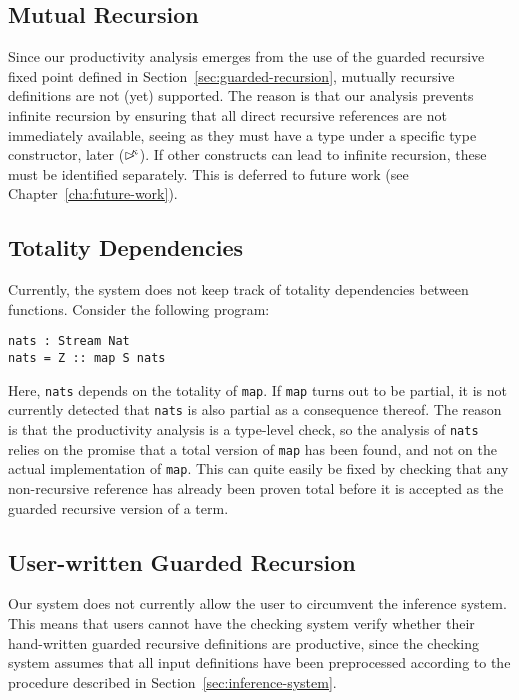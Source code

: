 
\subsection{Mutual Recursion}
\label{sec:mutual-recursion}
Since our productivity analysis emerges from the use of the guarded recursive
fixed point defined in Section~\ref{sec:guarded-recursion}, mutually recursive
definitions are not (yet) supported. The reason is that our analysis prevents
infinite recursion by ensuring that all direct recursive references are not
immediately available, seeing as they must have a type under a specific type
constructor, later ($\rhd^{\!\!\kappa}$). If other constructs can lead to infinite
recursion, these must be identified separately. This is deferred to future work
(see Chapter~\ref{cha:future-work}).

\subsection{Totality Dependencies}
\label{sec:total-depend}
Currently, the system does not keep track of totality dependencies between
functions. Consider the following program:
\begin{lstlisting}[mathescape, title=\idrisBlock]
nats : Stream Nat
nats = Z :: map S nats
\end{lstlisting}
Here, \texttt{nats} depends on the totality of \texttt{map}. If \texttt{map}
turns out to be partial, it is not currently detected that \texttt{nats} is also
partial as a consequence thereof. The reason is that the productivity analysis
is a type-level check, so the analysis of \texttt{nats} relies on the promise that
a total version of \texttt{map} has been found, and not on the actual
implementation of \texttt{map}. This can quite easily be fixed by checking that
any non-recursive reference has already been proven total before it is accepted
as the guarded recursive version of a term.

\subsection{User-written Guarded Recursion}
\label{sec:user-written-guarded}
Our system does not currently allow the user to circumvent the inference
system. This means that users cannot have the checking system verify whether
their hand-written guarded recursive definitions are productive, since the
checking system assumes that all input definitions have been preprocessed
according to the procedure described in Section~\ref{sec:inference-system}.

